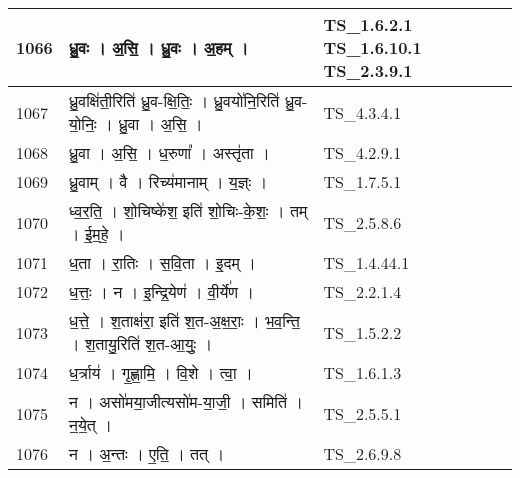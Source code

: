 \documentclass[17pt]{extarticle}
\begin{document}
\begin{longtable}{||p{0.4in}||p{4.9in}||p{0.9in}||}
    \hline
        
    1066 & ध्रु॒वः   ।   अ॒सि॒   ।   ध्रु॒वः   ।   अ॒हम्   ।    & TS\_1.6.2.1 TS\_1.6.10.1 TS\_2.3.9.1       \\
    
    \hline
        
    1067 & ध्रु॒वक्षि॑ती॒रिति॑ ध्रु॒व{-}क्षि॒तिः॒   ।   ध्रु॒वयो॑नि॒रिति॑ ध्रु॒व{-}यो॒निः॒   ।   ध्रु॒वा   ।   अ॒सि॒   ।    & TS\_4.3.4.1       \\
    
    \hline
        
    1068 & ध्रु॒वा   ।   अ॒सि॒   ।   ध॒रुणा᳚   ।   अस्तृ॑ता   ।    & TS\_4.2.9.1       \\
    
    \hline
        
    1069 & ध्रु॒वाम्   ।   वै   ।   रिच्य॑मानाम्   ।   य॒ज्ञ्ः   ।    & TS\_1.7.5.1       \\
    
    \hline
        
    1070 & ध्व॒र॒ति॒   ।   शो॒चिष्के॑श॒ इति॑ शो॒चिः{-}के॒शः॒   ।   तम्   ।   ई॒म॒हे॒   ।    & TS\_2.5.8.6       \\
    
    \hline
        
    1071 & ध॒ता   ।   रा॒तिः   ।   स॒वि॒ता   ।   इ॒दम्   ।    & TS\_1.4.44.1       \\
    
    \hline
        
    1072 & ध॒त्तः॒   ।   न   ।   इ॒न्द्रि॒येण॑   ।   वी॒र्ये॑ण   ।    & TS\_2.2.1.4       \\
    
    \hline
        
    1073 & ध॒त्ते॒   ।   श॒ताक्ष॑रा॒ इति॑ श॒त{-}अ॒क्ष॒राः॒   ।   भ॒व॒न्ति॒   ।   श॒तायु॒रिति॑ श॒त{-}आ॒युः॒   ।    & TS\_1.5.2.2       \\
    
    \hline
        
    1074 & ध॒र्त्राय॑   ।   गृ॒ह्णा॒मि॒   ।   वि॒शे   ।   त्वा॒   ।    & TS\_1.6.1.3       \\
    
    \hline
        
    1075 & न   ।   असो॑मया॒जीत्यसो॑म{-}या॒जी॒   ।   समिति॑   ।   न॒ये॒त्   ।    & TS\_2.5.5.1       \\
    
    \hline
        
    1076 & न   ।   अ॒न्तः   ।   ए॒ति॒   ।   तत्   ।    & TS\_2.6.9.8       \\
    

\end{longtable}
\end{document}
